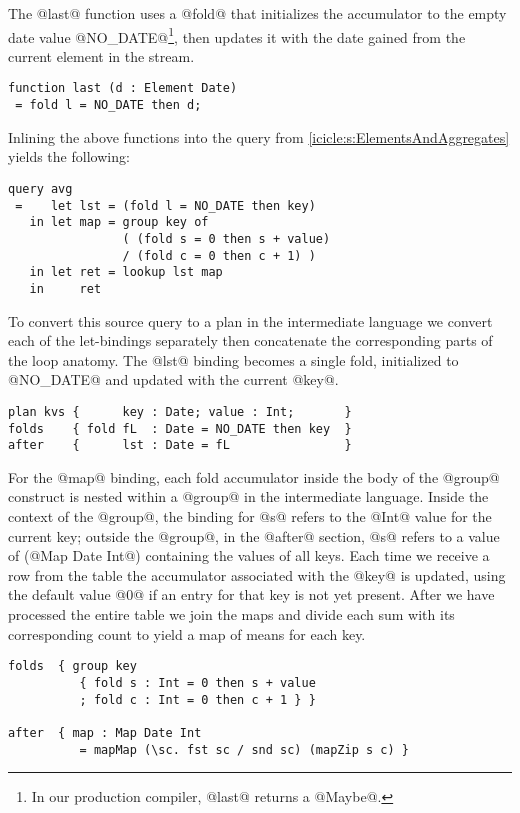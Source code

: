 The @last@ function uses a @fold@ that initializes the accumulator to the empty date value @NO_DATE@\footnote{In our production compiler, @last@ returns a @Maybe@.}, then updates it with the date gained from the current element in the stream.
\begin{lstlisting}
function last (d : Element Date)
 = fold l = NO_DATE then d;
\end{lstlisting}



Inlining the above functions into the query from \autoref{icicle:s:ElementsAndAggregates} yields the following:
\begin{lstlisting}
query avg
 =    let lst = (fold l = NO_DATE then key)
   in let map = group key of
                ( (fold s = 0 then s + value)
                / (fold c = 0 then c + 1) )
   in let ret = lookup lst map
   in     ret
\end{lstlisting}

To convert this source query to a plan in the intermediate language we convert each of the let-bindings separately then concatenate the corresponding parts of the loop anatomy.
The @lst@ binding becomes a single fold, initialized to @NO_DATE@ and updated with the current @key@.
\begin{lstlisting}
plan kvs {      key : Date; value : Int;       }
folds    { fold fL  : Date = NO_DATE then key  }
after    {      lst : Date = fL                }
\end{lstlisting}

For the @map@ binding, each fold accumulator inside the body of the @group@ construct is nested within a @group@ in the intermediate language.
Inside the context of the @group@, the binding for @s@ refers to the @Int@ value for the current key; outside the @group@, in the @after@ section, @s@ refers to a value of (@Map Date Int@) containing the values of all keys.
Each time we receive a row from the table the accumulator associated with the @key@ is updated, using the default value @0@ if an entry for that key is not yet present.
After we have processed the entire table we join the maps and divide each sum with its corresponding count to yield a map of means for each key.
\begin{lstlisting}
folds  { group key
          { fold s : Int = 0 then s + value
          ; fold c : Int = 0 then c + 1 } }

after  { map : Map Date Int
          = mapMap (\sc. fst sc / snd sc) (mapZip s c) }
\end{lstlisting}

